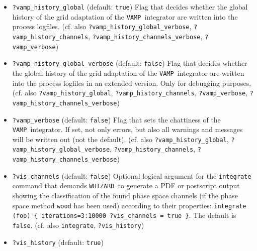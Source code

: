 \documentclass[12pt]{book}
\newcommand{\ttt}[1]{\texttt{#1}}
\newcommand{\whizard}{\texttt{WHIZARD}}
\newcommand{\vamp}{\texttt{VAMP}}
\begin{document}
\begin{itemize}
\ttt{?vamp\_history\_channels\_verbose} \qquad (default: \ttt{false})
\newline 
Flag that decides whether the history of the grid adaptation of
the \vamp\ integrator for every single channel are written into the
process logfiles in an extended version. Only for debugging purposes.
(cf. also \ttt{?vamp\_history\_global},
\ttt{?vamp\_history\_channels}, \ttt{?vamp\_verbose},
\ttt{?vamp\_history\_global\_verbose}) 
\item
\ttt{?vamp\_history\_global} \qquad (default: \ttt{true}) \newline
Flag that decides whether the global history of the grid adaptation of
the \vamp\ integrator are written into the process logfiles.
(cf. also \ttt{?vamp\_history\_global\_verbose},
\ttt{?vamp\_history\_channels},
\ttt{?vamp\_history\_channels\_verbose}, \ttt{?vamp\_verbose}) 
\item
\ttt{?vamp\_history\_global\_verbose} \qquad (default: \ttt{false})
\newline 
Flag that decides whether the global history of the grid adaptation of
the \vamp\ integrator are written into the process logfiles in an
extended version. Only for debugging purposes.
(cf. also \ttt{?vamp\_history\_global},
\ttt{?vamp\_history\_channels}, \ttt{?vamp\_verbose},
\ttt{?vamp\_history\_channels\_verbose}) 
\item
\ttt{?vamp\_verbose} \qquad (default: \ttt{false}) \newline
Flag that sets the chattiness of the \vamp\ integrator. If set, not
only errors, but also all warnings and messages will be written out
(not the default). (cf. also \newline \ttt{?vamp\_history\_global},
\ttt{?vamp\_history\_global\_verbose}, \ttt{?vamp\_history\_channels},
\newline \ttt{?vamp\_history\_channels\_verbose})
\item
\ttt{?vis\_channels} \qquad (default: \ttt{false}) \newline
Optional logical argument for the \ttt{integrate} command that demands
\whizard\ to generate a PDF or postscript output showing the
classification of the found phase space channels (if the phase space
method \ttt{wood} has been used) according to their
properties: \ttt{integrate (foo) \{ iterations=3:10000 ?vis\_channels
= true \}}. The default is \ttt{false}. 
(cf. also \ttt{integrate}, \ttt{?vis\_history})
\item
\ttt{?vis\_history} \qquad (default: \ttt{true}) \newline

\end{itemize}
\end{document}
